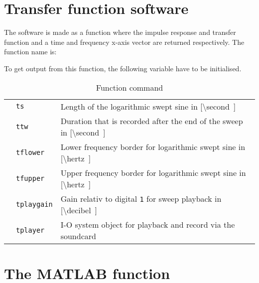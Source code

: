 \section*{Transfer function software}
The software is made as a function where the impulse response and transfer function and a time and frequency x-axis vector are returned respectively. The function name is:


To get output from this function, the following variable have to be initialised.



 \begin{table}[H]
\centering
\caption{Function command}
\label{my-label}
\begin{tabular}{lll}
 & \texttt{ts} & Length of the logarithmic swept sine in {[}\SI{\second}{]} \\
 & \texttt{ttw} & Duration that is recorded after the end of the sweep in {[}\SI{\second}{]}    \\
 & \texttt{tflower} & Lower frequency border for logarithmic swept sine in {[}\SI{\hertz}{]}  \\
 & \texttt{tfupper} & Upper frequency border for logarithmic swept sine in {[}\SI{\hertz}{]} \\
 & \texttt{tplaygain} & Gain relativ to digital \texttt{1} for sweep playback in {[}\SI{\decibel}{]} \\
 & \texttt{tplayer}  & I-O system object for playback and record via the soundcard
\end{tabular}
\end{table}



\section*{The MATLAB function}

